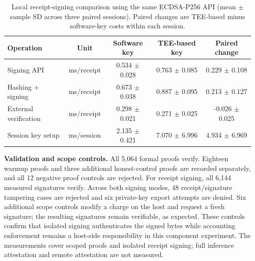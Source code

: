 \begin{table}[!t]
\centering
\caption{Local receipt-signing comparison using the same ECDSA-P256 API (mean $\pm$ sample SD across three paired sessions). Paired changes are TEE-based minus software-key costs within each session.}
\label{tab:c4-tee-signing}
\footnotesize
\renewcommand{\arraystretch}{1.08}
\begin{tabular*}{\textwidth}{@{\hspace{3pt}}l@{\extracolsep{\fill}}cccc@{\hspace{3pt}}}
\toprule
\textbf{Operation} & \textbf{Unit} & \textbf{Software key} & \textbf{TEE-based key} & \textbf{Paired change} \\
\midrule
Signing API & ms/receipt & 0.534 $\pm$ 0.028 & 0.763 $\pm$ 0.085 & 0.229 $\pm$ 0.108 \\
Hashing + signing & ms/receipt & 0.673 $\pm$ 0.038 & 0.887 $\pm$ 0.095 & 0.213 $\pm$ 0.127 \\
External verification & ms/receipt & 0.298 $\pm$ 0.021 & 0.271 $\pm$ 0.025 & -0.026 $\pm$ 0.025 \\
Session key setup & ms/session & 2.135 $\pm$ 0.421 & 7.070 $\pm$ 6.996 & 4.934 $\pm$ 6.969 \\
\bottomrule
\end{tabular*}
\end{table}

\noindent\textbf{Validation and scope controls.}
All 5,064 formal proofs verify. Eighteen warmup proofs and three additional
honest-control proofs are recorded separately, and all 12 negative proof
controls are rejected. For receipt signing, all 6,144 measured signatures
verify. Across both signing modes, 48 receipt/signature tampering cases
are rejected and six private-key export attempts are denied. Six additional
scope controls modify a charge on the host and request a fresh signature;
the resulting signatures remain verifiable, as expected. These controls
confirm that isolated signing authenticates the signed bytes while
accounting enforcement remains a host-side responsibility in this component
experiment. The measurements cover scoped proofs and isolated receipt
signing; full inference attestation and remote attestation are not measured.
